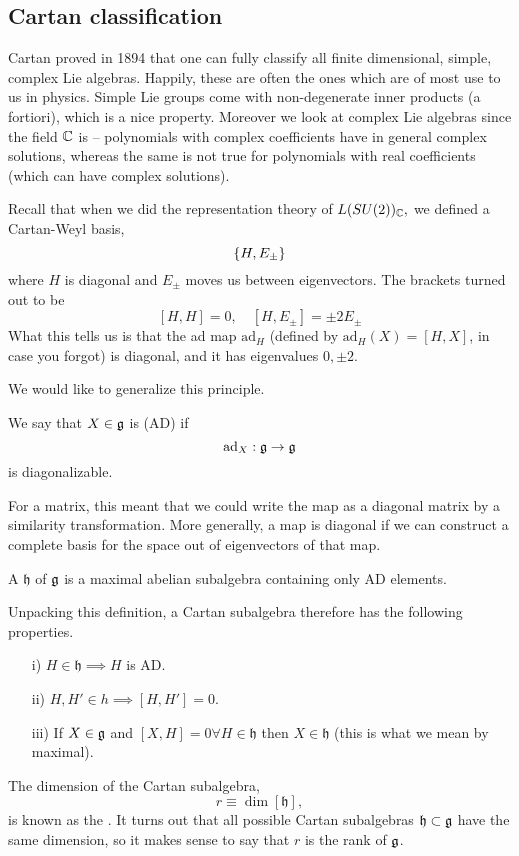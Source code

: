 \subsection*{Cartan classification} Cartan proved in 1894 that one can fully classify all finite dimensional, simple, complex Lie algebras. Happily, these are often the ones which are of most use to us in physics. Simple Lie groups come with non-degenerate inner products (a fortiori), which is a nice property. Moreover we look at complex Lie algebras since the field $\mathbb{C}$ is -- polynomials with complex coefficients have in general complex solutions, whereas the same is not true for polynomials with real coefficients (which can have complex solutions).

Recall that when we did the representation theory of $L(SU(2))_{\mathbb{C}},$ we defined a Cartan-Weyl basis,
$$\{H,E_\pm\}$$ where $H$ is diagonal and $E_\pm$ moves us between eigenvectors. The brackets turned out to be
$$[H,H]=0,\quad [H,E_\pm]=\pm 2 E_{\pm}$$
What this tells us is that the ad map $\text{ad}_H$ (defined by $\text{ad}_H(X)=[H,X]$, in case you forgot) is diagonal, and it has eigenvalues $0,\pm 2$.

We would like to generalize this principle.
\begin{defn}
We say that $X\in \mathfrak{g}$ is  (AD) if
$$\text{ad}_X:\mathfrak{g} \to \mathfrak{g}$$
is diagonalizable.
\end{defn}
For a matrix, this meant that we could write the map as a diagonal matrix by a similarity transformation. More generally, a map is diagonal if we can construct a complete basis for the space out of eigenvectors of that map.

\begin{defn}
A  $\mathfrak{h}$ of $\mathfrak{g}$ is a maximal abelian subalgebra containing only AD elements.
\end{defn}
Unpacking this definition, a Cartan subalgebra therefore has the following properties.
\begin{itemize}
    \item[i)] $H\in \mathfrak{h}\implies H$ is AD.
    \item[ii)] $H,H'\in h \implies [H,H']=0.$
    \item[iii)] If $X\in \mathfrak{g}$ and $[X,H]=0 \forall H \in \mathfrak{h}$ then $X\in \mathfrak{h}$ (this is what we mean by maximal).
\end{itemize}
\begin{defn}
The dimension of the Cartan subalgebra,
$$r\equiv \dim[\mathfrak{h}],$$
is known as the . It turns out that all possible Cartan subalgebras $\mathfrak{h}\subset \mathfrak{g}$ have the same dimension, so it makes sense to say that $r$ is the rank of $\mathfrak{g}$.
\end{defn}

